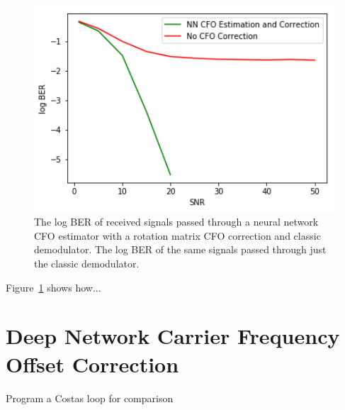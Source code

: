 \begin{figure}
\begin{center}
\includegraphics[width=12cm]{figures/cfo/cfo_estimation.png}
\caption{The log BER of received signals passed through a neural network CFO estimator with a rotation matrix CFO correction and classic demodulator. The log BER of the same signals passed through just the classic demodulator.}
\label{fig:cfo_est}
\end{center}
\end{figure}

Figure~\ref{fig:cfo_est} shows how...

\section{Deep Network Carrier Frequency Offset Correction}
Program a Costas loop for comparison 